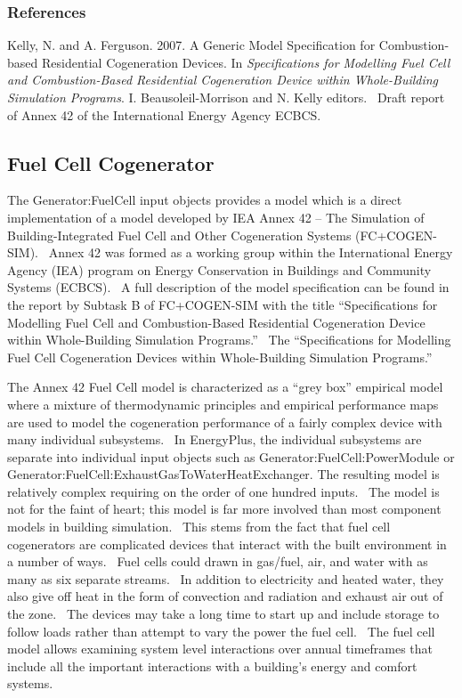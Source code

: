 \subsubsection{References}\label{references-024}

Kelly, N. and A. Ferguson. 2007. A Generic Model Specification for Combustion-based Residential Cogeneration Devices. In \emph{Specifications for Modelling Fuel Cell and Combustion-Based Residential Cogeneration Device within Whole-Building Simulation Programs}. I. Beausoleil-Morrison and N. Kelly editors.~ Draft report of Annex 42 of the International Energy Agency ECBCS.

\subsection{Fuel Cell Cogenerator}\label{fuel-cell-cogenerator}

The Generator:FuelCell input objects provides a model which is a direct implementation of a model developed by IEA Annex 42 -- The Simulation of Building-Integrated Fuel Cell and Other Cogeneration Systems (FC+COGEN-SIM).~ Annex 42 was formed as a working group within the International Energy Agency (IEA) program on Energy Conservation in Buildings and Community Systems (ECBCS).~ A full description of the model specification can be found in the report by Subtask B of FC+COGEN-SIM with the title ``Specifications for Modelling Fuel Cell and Combustion-Based Residential Cogeneration Device within Whole-Building Simulation Programs.''~ The ``Specifications for Modelling Fuel Cell Cogeneration Devices within Whole-Building Simulation Programs.''

The Annex 42 Fuel Cell model is characterized as a ``grey box'' empirical model where a mixture of thermodynamic principles and empirical performance maps are used to model the cogeneration performance of a fairly complex device with many individual subsystems.~ In EnergyPlus, the individual subsystems are separate into individual input objects such as Generator:FuelCell:PowerModule or Generator:FuelCell:ExhaustGasToWaterHeatExchanger. The resulting model is relatively complex requiring on the order of one hundred inputs.~ The model is not for the faint of heart; this model is far more involved than most component models in building simulation.~ This stems from the fact that fuel cell cogenerators are complicated devices that interact with the built environment in a number of ways.~ Fuel cells could drawn in gas/fuel, air, and water with as many as six separate streams.~ In addition to electricity and heated water, they also give off heat in the form of convection and radiation and exhaust air out of the zone.~ The devices may take a long time to start up and include storage to follow loads rather than attempt to vary the power the fuel cell.~ The fuel cell model allows examining system level interactions over annual timeframes that include all the important interactions with a building's energy and comfort systems.

